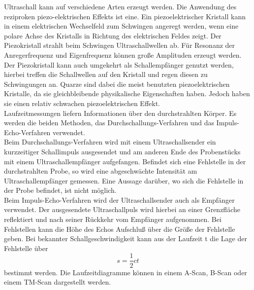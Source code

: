 Ultraschall kann auf verschiedene Arten erzeugt werden.
Die Anwendung des reziproken piezo-elektrischen Effekts ist eine.
Ein piezoelektrischer Kristall kann in einem elektrischen Wechselfeld zum Schwingen angeregt werden,
wenn eine polare Achse des Kristalls in Richtung des elektrischen Feldes zeigt.
Der Piezokristall strahlt beim Schwingen Ultraschallwellen ab.
Für Resonanz der Anregerfrequenz und Eigenfrequenz können große Amplituden erzeugt werden.
Der Piezokristall kann auch umgekehrt als Schallempfänger genutzt werden, hierbei treffen die Schallwellen auf den Kristall und regen diesen zu Schwingungen an.
Quarze sind dabei die meist benutzten piezoelektrischen Kristalle, da sie gleichbleibende physikalische Eigenschaften haben. Jedoch haben sie einen relativ schwachen piezoelektrischen Effekt.\\

Laufzeitmessungen liefern Informationen über den durchstrahlten Körper.
Es werden die beiden Methoden, das Durchschallungs-Verfahren und das Impuls-Echo-Verfahren verwendet.\\

Beim Durchschallungs-Verfahren wird mit einem Ultraschallsender ein kurzzeitiger Schallimpuls ausgesendet und am anderen Ende
des Probenstücks mit einem Ultraschallempfänger aufgefangen.
Befindet sich eine Fehlstelle in der durchstrahlten Probe, so wird eine abgeschwächte Intensität am Ultraschallempfänger gemessen.
Eine Aussage darüber, wo sich die Fehlstelle in der Probe befindet, ist nicht möglich. \\

Beim Impuls-Echo-Verfahren wird der Ultraschallsender auch als Empfänger verwendet.
Der ausgesendete Ultraschallpuls wird hierbei an einer Grenzfläche reflektiert und nach seiner Rückkehr vom Empfänger aufgenommen.
Bei Fehlstellen kann die Höhe des Echos Aufschluß über die Größe der Fehlstelle geben.
Bei bekannter Schallgeschwindigkeit kann aus der Laufzeit t die Lage der Fehlstelle über
\begin{equation}
    s = \frac{1}{2} c t
    \label{eqn:gl4}
\end{equation}
bestimmt werden.
Die Laufzeitdiagramme können in einem A-Scan, B-Scan oder einem TM-Scan dargestellt werden.
